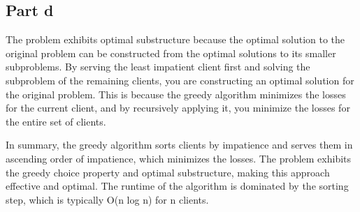 \subsection*{Part d}
The problem exhibits optimal substructure because the optimal solution to the original problem can be constructed from the optimal solutions to its smaller subproblems. By serving the least impatient client first and solving the subproblem of the remaining clients, you are constructing an optimal solution for the original problem. This is because the greedy algorithm minimizes the losses for the current client, and by recursively applying it, you minimize the losses for the entire set of clients.

In summary, the greedy algorithm sorts clients by impatience and serves them in ascending order of impatience, which minimizes the losses. The problem exhibits the greedy choice property and optimal substructure, making this approach effective and optimal. The runtime of the algorithm is dominated by the sorting step, which is typically O(n log n) for n clients.




